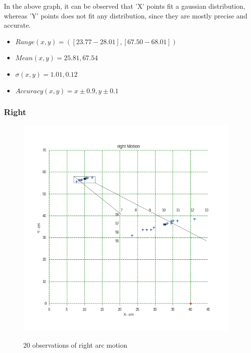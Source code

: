 \documentclass[11pt,a4paper]{article}
\begin{document}
\begin{itemize}
In the above graph, it can be observed that 'X' points fit a gaussian distribution, whereas 'Y' points does not fit any distribution, since they are mostly precise and accurate.
\begin{itemize}
\item $ Range (x,y) =([23.77-28.01],[67.50-68.01]) $
\item $ Mean (x, y) = 25.81,67.54$
\item $ \sigma (x, y)= 1.01, 0.12 $
\item $ Accuracy (x,y) = x \pm0.9  , y \pm0.1 $  
\end{itemize}

\subsubsection{Right}
\begin{figure}[H]
\centering	
\includegraphics[width=1.2\linewidth]{right}
\label{fig:right}
\caption{20 observations of right arc motion}
\end{figure}


\end{itemize}
\end{document}
